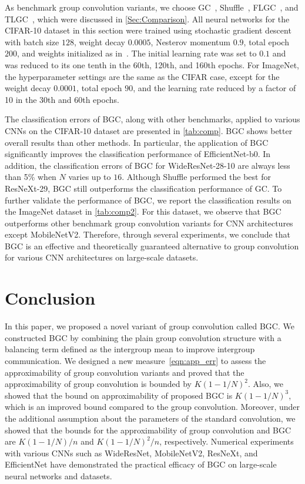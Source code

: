\documentclass[preprint,12pt,authoryear]{elsarticle}
\numberwithin{equation}{section}
\theoremstyle{remark}
\begin{document}
As benchmark group convolution variants, we choose GC~\citep{krizhevsky2012imagenet}, Shuffle~\citep{zhang2018shufflenet}, FLGC~\citep{Wang_2019_CVPR}, and TLGC~\citep{lee2022two}, which were discussed in \cref{Sec:Comparison}.
All neural networks for the CIFAR-10 dataset in this section were trained using stochastic gradient descent with batch size $128$, weight decay $0.0005$, Nesterov momentum $0.9$,
total epoch $200$, and weights initialized as in~\citep{he2015delving}.
The initial learning rate was set to $0.1$ and was reduced to its one tenth in the 60th, 120th, and 160th epochs.
For ImageNet, the hyperparameter settings are the same as the CIFAR case, except for the weight decay $0.0001$, total epoch $90$, and the learning rate reduced by a factor of 10 in the 30th and 60th epochs.

The classification errors of BGC, along with other benchmarks, applied to various CNNs on the CIFAR-10 dataset are presented in \cref{tab:comp}.
BGC shows better overall results than other methods.
In particular, the application of BGC significantly improves the classification performance of EfficientNet-b0.
In addition, the classification errors of BGC for WideResNet-28-10 are always less than 5\% when $N$ varies up to $16$.
Although Shuffle performed the best for ResNeXt-29, BGC still outperforms the classification performance of GC.
To further validate the performance of BGC, we report the classification results on the ImageNet dataset in \cref{tab:comp2}.
For this dataset, we observe that BGC outperforms other benchmark group convolution variants for CNN architectures except MobileNetV2.
Therefore, through several experiments, we conclude that BGC is an effective and theoretically guaranteed alternative to group convolution for various CNN architectures on large-scale datasets.

\section{Conclusion}
\label{Sec:Conc}
In this paper, we proposed a novel variant of group convolution called BGC.
We constructed BGC by combining the plain group convolution structure with a balancing term defined as the intergroup mean to improve intergroup communication.
We designed a new measure~\eqref{eqn:app_err} to assess the approximability of group convolution variants and proved that the approximability of group convolution is bounded by $K(1-1/N)^{2}$.
Also, we showed that the bound on approximability of proposed BGC is $K(1-1/N)^{3}$, which is an improved bound compared to the group convolution.
Moreover, under the additional assumption about the parameters of the standard convolution, we showed that the bounds for the approximability of group convolution and BGC are $K(1-1/N)/n$ and $K(1-1/N)^{2}/n$, respectively.
Numerical experiments with various CNNs such as WideResNet, MobileNetV2, ResNeXt, and EfficientNet have demonstrated the practical efficacy of BGC on large-scale neural networks and datasets.
\end{document}
